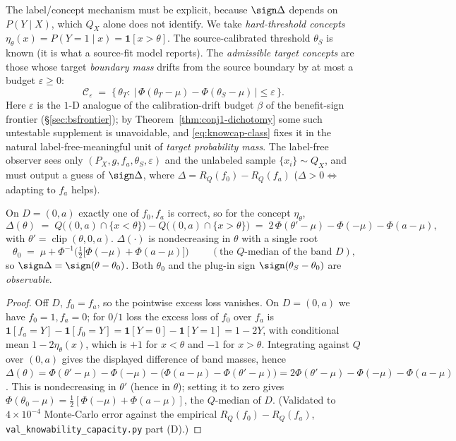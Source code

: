 The label/concept mechanism must be explicit, because $\sign\Delta$ depends on
$P(Y\mid X)$, which $Q_X$ alone does not identify. We take \emph{hard-threshold
concepts} $\eta_\theta(x)=P(Y=1\mid x)=\mathbf 1[x>\theta]$. The
source-calibrated threshold $\theta_S$ is known (it is what a source-fit model
reports). The \emph{admissible target concepts} are those whose target
\emph{boundary mass} drifts from the source boundary by at most a budget
$\varepsilon\ge0$:
\begin{equation}\label{eq:knowcap-class}
  \mathcal C_\varepsilon \;=\;
  \Big\{\,\theta_T:\ \big|\,\Phi(\theta_T-\mu)-\Phi(\theta_S-\mu)\,\big|\le\varepsilon\,\Big\}.
\end{equation}
Here $\varepsilon$ is the $1$-D analogue of the calibration-drift budget $\beta$ of
the benefit-sign frontier (\S\ref{sec:bsfrontier}); by
Theorem~\ref{thm:conj1-dichotomy} some such untestable supplement is unavoidable,
and \eqref{eq:knowcap-class} fixes it in the natural label-free-meaningful unit of
\emph{target probability mass}. The label-free observer sees only
$(P_X,g,f_a,\theta_S,\varepsilon)$ and the unlabeled sample $\{x_i\}\sim Q_X$, and
must output a guess of $\sign\Delta$, where
\(
  \Delta=R_Q(f_0)-R_Q(f_a)
\)
($\Delta>0\iff$ adapting to $f_a$ helps).

\begin{lemma}\label{lem:knowcap-identity}
On $D=(0,a)$ exactly one of $f_0,f_a$ is correct, so for the concept $\eta_\theta$,
\[
  \Delta(\theta)
  \;=\; Q\!\big((0,a)\cap\{x<\theta\}\big)-Q\!\big((0,a)\cap\{x>\theta\}\big)
  \;=\; 2\,\Phi(\theta'-\mu)-\Phi(-\mu)-\Phi(a-\mu),
\]
with $\theta'=\operatorname{clip}(\theta,0,a)$. $\Delta(\cdot)$ is nondecreasing in
$\theta$ with a single root
\[
  \boxed{\ \theta_0\;=\;\mu+\Phi^{-1}\!\Big(\tfrac12\big[\Phi(-\mu)+\Phi(a-\mu)\big]\Big)\ }
  \qquad(\text{the $Q$-median of the band }D),
\]
so $\sign\Delta=\sign(\theta-\theta_0)$. Both $\theta_0$ and the plug-in sign
$\sign(\theta_S-\theta_0)$ are \emph{observable}.
\end{lemma}
\begin{proof}
Off $D$, $f_0=f_a$, so the pointwise excess loss vanishes. On $D=(0,a)$ we have
$f_0=1,f_a=0$; for $0/1$ loss the excess loss of $f_0$ over $f_a$ is
$\mathbf 1[f_a{=}Y]-\mathbf 1[f_0{=}Y]=\mathbf 1[Y{=}0]-\mathbf 1[Y{=}1]=1-2Y$, with
conditional mean $1-2\eta_\theta(x)$, which is $+1$ for $x<\theta$ and $-1$ for
$x>\theta$. Integrating against $Q$ over $(0,a)$ gives the displayed difference of
band masses, hence
$\Delta(\theta)=\Phi(\theta'\!-\mu)-\Phi(-\mu)-\big(\Phi(a-\mu)-\Phi(\theta'\!-\mu)\big)
=2\Phi(\theta'\!-\mu)-\Phi(-\mu)-\Phi(a-\mu)$. This is nondecreasing in $\theta'$
(hence in $\theta$); setting it to zero gives $\Phi(\theta_0-\mu)=\tfrac12[\Phi(-\mu)+\Phi(a-\mu)]$,
the $Q$-median of $D$. (Validated to $4\times10^{-4}$ Monte-Carlo error against the
empirical $R_Q(f_0)-R_Q(f_a)$, \texttt{val\_knowability\_capacity.py} part (D).)
\end{proof}

